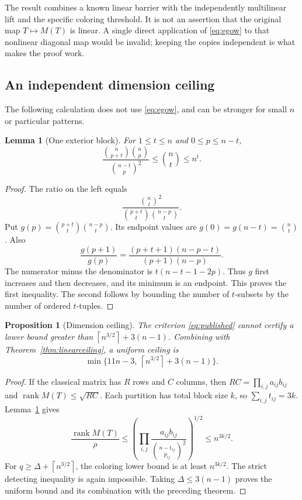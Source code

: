 \documentclass[11pt]{article}
\newtheorem{lemma}[theorem]{Lemma}
\newtheorem{proposition}[theorem]{Proposition}
\theoremstyle{definition}
\theoremstyle{remark}
\newcommand{\rank}{\operatorname{rank}}
\newcommand{\ceil}[1]{\left\lceil #1\right\rceil}
\begin{document}
The result combines a known linear barrier with the independently multilinear lift and the specific coloring threshold. It is not an assertion that the original map $T\mapsto M(T)$ is linear. A single direct application of \eqref{eq:egow} to that nonlinear diagonal map would be invalid; keeping the copies independent is what makes the proof work.

\subsection{An independent dimension ceiling}

The following calculation does not use \eqref{eq:egow}, and can be stronger for small $n$ or particular patterns.

\begin{lemma}[One exterior block]\label{lem:block}
For $1\le t\le n$ and $0\le p\le n-t$,
\begin{equation}\label{eq:block}
 \frac{\binom n{p+t}\binom n p}{\binom{n-t}p^2}
 \le \binom nt\le n^t.
\end{equation}
\end{lemma}
\begin{proof}
The ratio on the left equals
\[
 \frac{\binom nt^2}{\binom{p+t}t\binom{n-p}t}.
\]
Put $g(p)=\binom{p+t}t\binom{n-p}t$. Its endpoint values are $g(0)=g(n-t)=\binom nt$. Also
\[
 \frac{g(p+1)}{g(p)}=\frac{(p+t+1)(n-p-t)}{(p+1)(n-p)}.
\]
The numerator minus the denominator is $t(n-t-1-2p)$. Thus $g$ first increases and then decreases, and its minimum is an endpoint. This proves the first inequality. The second follows by bounding the number of $t$-subsets by the number of ordered $t$-tuples.
\end{proof}

\begin{proposition}[Dimension ceiling]\label{prop:dimceiling}
The criterion \eqref{eq:published} cannot certify a lower bound greater than $\ceil{n^{3/2}}+3(n-1)$. Combining with Theorem~\ref{thm:linearceiling}, a uniform ceiling is
\begin{equation}\label{eq:combined}
 \min\{11n-3,\ \ceil{n^{3/2}}+3(n-1)\}.
\end{equation}
\end{proposition}
\begin{proof}
If the classical matrix has $R$ rows and $C$ columns, then $RC=\prod_{i,j}a_{ij}b_{ij}$ and $\rank M(T)\le\sqrt{RC}$. Each partition has total block size $k$, so $\sum_{i,j}t_{ij}=3k$. Lemma~\ref{lem:block} gives
\[
 \frac{\rank M(T)}\rho
 \le\left(\prod_{i,j}\frac{a_{ij}b_{ij}}{\binom{n-t_{ij}}{p_{ij}}^2}\right)^{1/2}
 \le n^{3k/2}.
\]
For $q\ge\Delta+\ceil{n^{3/2}}$, the coloring lower bound is at least $n^{3k/2}$. The strict detecting inequality is again impossible. Taking $\Delta\le3(n-1)$ proves the uniform bound and its combination with the preceding theorem.
\end{proof}
\end{document}
